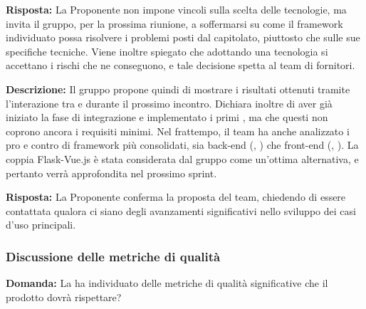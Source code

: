\par \textbf{Risposta:} La Proponente non impone vincoli sulla scelta delle tecnologie, ma invita il gruppo, per la prossima riunione, a soffermarsi su come il framework individuato possa risolvere i problemi posti dal capitolato, piuttosto che sulle sue specifiche tecniche. Viene inoltre spiegato che adottando una tecnologia si accettano i rischi che ne conseguono, e tale decisione spetta al team di fornitori.

\par \textbf{Descrizione:} Il gruppo propone quindi di mostrare i risultati ottenuti tramite l'interazione tra  e  durante il prossimo incontro. Dichiara inoltre di aver già iniziato la fase di integrazione e implementato i primi , ma che questi non coprono ancora i requisiti minimi. Nel frattempo, il team ha anche analizzato i pro e contro di framework più consolidati, sia back-end (, ) che front-end (, ). La coppia Flask-Vue.js è stata considerata dal gruppo come un’ottima alternativa, e pertanto verrà approfondita nel prossimo sprint.

\par \textbf{Risposta:} La Proponente conferma la proposta del team, chiedendo di essere contattata qualora ci siano degli avanzamenti significativi nello sviluppo dei casi d'uso principali.

\subsubsection{Discussione delle metriche di qualità}

\par \textbf{Domanda:} La  ha individuato delle metriche di qualità significative che il prodotto dovrà rispettare?

